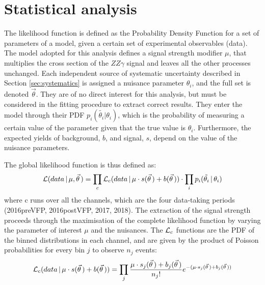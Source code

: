 \section{Statistical analysis}
\label{sec:statistical_analysis}
The likelihood function is defined as the Probability Density Function for a set of parameters of a model, given a certain set of experimental observables (data).
The model adopted for this analysis defines a signal strength modifier $\mu$, that multiplies the cross section of the $ZZ\gamma$ signal and leaves all the other processes unchanged.
Each independent source of systematic uncertainty described in Section \ref{sec:systematics} is assigned a nuisance parameter $\theta_i$, and the full set is denoted $\vec\theta$.
They are of no direct interest for this analysis, but must be considered in the fitting procedure to extract correct results.
They enter the model through their PDF $p_i(\tilde{\theta_i}|\theta_i)$, which is the probability of measuring a certain value of the parameter given that the true value is $\theta_i$.
Furthermore, the expected yields of background, $b$, and signal, $s$, depend on the value of the nuisance parameters.

The global likelihood function is thus defined as:
\begin{equation}
  \label{eq:likelihood_full}
  \mathcal{L}(data\, |\, \mu, \vec\theta\,) = \prod_c \mathcal{L}_c(data\, |\, \mu \cdot s(\vec\theta\,) + b(\vec\theta\,)) \cdot \prod_i p_i(\tilde{\theta_i}\, |\, \theta_i)
\end{equation}
where c runs over all the channels, which are the four data-taking periods (2016preVFP, 2016postVFP, 2017, 2018).
The extraction of the signal strength proceeds through the maximisation of the complete likelihood function by varying the parameter of interest $\mu$ and the nuisances.
The $\mathcal{L}_c$ functions are the PDF of the binned distributions in each channel, and are given by the product of Poisson probabilities for every bin $j$ to observe $n_j$ events:
\begin{equation}
  \label{eq:likelihood_bin}
  \mathcal{L}_c(data\, |\, \mu \cdot s(\vec\theta\,) + b(\vec\theta\,)) = \prod_j \frac{\mu \cdot s_j(\vec\theta\,) + b_j(\vec\theta\,)}{n_j!} e^{-(\mu \cdot s_j(\vec\theta\,) + b_j(\vec\theta\,))}
\end{equation}

